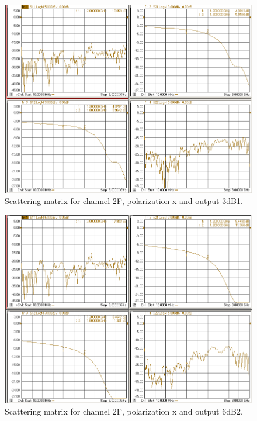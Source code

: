 \documentclass[12pt,a4paper,oneside]{article}
\begin{document}
\begin{figure}[H]
\centering
\includegraphics[width=0.9\linewidth]{VNA_results/2Fx_3dB1.png}
\caption{Scattering matrix for channel 2F, polarization x and output 3dB1.}
\label{fig:2Fx_3dB1}
\end{figure}


\begin{figure}[H]
\centering
\includegraphics[width=0.9\linewidth]{VNA_results/2Fx_6dB2.png}
\caption{Scattering matrix for channel 2F, polarization x and output 6dB2.}
\label{fig:2Fx_6dB2}
\end{figure}
\end{document}
